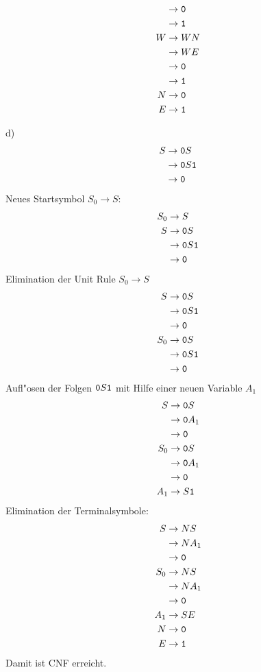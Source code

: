\begin{loesung}
\begin{teilaufgaben}
\begin{align*}
 &\rightarrow {\tt 0}\\
 &\rightarrow {\tt 1}\\
W&\rightarrow WN\\
 &\rightarrow WE\\
 &\rightarrow {\tt 0}\\
 &\rightarrow {\tt 1}\\
N&\rightarrow {\tt 0}\\
E&\rightarrow {\tt 1}\\
\end{align*}
\item[d)]
\begin{align*}
S&\rightarrow {\tt 0}S\\
 &\rightarrow {\tt 0}S{\tt 1}\\
 &\rightarrow {\tt 0}
\end{align*}
Neues Startsymbol $S_0\to S$:
\begin{align*}
S_0&\rightarrow S\\
S&\rightarrow {\tt 0}S\\
 &\rightarrow {\tt 0}S{\tt 1}\\
 &\rightarrow {\tt 0}
\end{align*}
Elimination der Unit Rule $S_0\to S$
\begin{align*}
S&\rightarrow {\tt 0}S\\
 &\rightarrow {\tt 0}S{\tt 1}\\
 &\rightarrow {\tt 0}\\
S_0&\rightarrow {\tt 0}S\\
 &\rightarrow {\tt 0}S{\tt 1}\\
 &\rightarrow {\tt 0}
\end{align*}
Aufl"osen der Folgen ${\tt 0}S{\tt 1}$ mit Hilfe einer neuen Variable
$A_1$
\begin{align*}
S&\rightarrow {\tt 0}S\\
 &\rightarrow {\tt 0}A_1\\
 &\rightarrow {\tt 0}\\
S_0&\rightarrow {\tt 0}S\\
 &\rightarrow {\tt 0}A_1\\
 &\rightarrow {\tt 0}\\
A_1&\rightarrow S{\tt 1}
\end{align*}
Elimination der Terminalsymbole:
\begin{align*}
S&\rightarrow NS\\
 &\rightarrow NA_1\\
 &\rightarrow {\tt 0}\\
S_0&\rightarrow NS\\
 &\rightarrow NA_1\\
 &\rightarrow {\tt 0}\\
A_1&\rightarrow SE\\
N&\rightarrow {\tt 0}\\
E&\rightarrow {\tt 1}\\
\end{align*}
Damit ist CNF erreicht.
\end{teilaufgaben}
\end{loesung}
